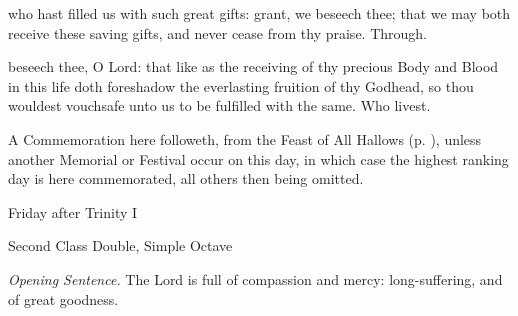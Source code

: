 
\clearpage
\postcommunion
{} who hast filled us with such great gifts: grant, we beseech thee; that we may both receive these saving gifts, and never cease from thy praise. Through.

 beseech thee, O Lord: that like as the receiving of thy precious Body and Blood in this life doth foreshadow the everlasting fruition of thy Godhead, so thou wouldest vouchsafe unto us to be fulfilled with the same. Who livest.

\begin{rubric}
	A Commemoration  here followeth, from the Feast of All Hallows (p. \pageref{AllHallowsCollect}), unless another Memorial or Festival occur on this day, in which case the highest ranking day is here commemorated, all others then being omitted.
\end{rubric}


\begin{inhead}
	{Friday after Trinity I}\par
    {Second Class Double, Simple Octave}
\end{inhead}
\par\noindent
\textit{Opening Sentence.} The Lord is full of compassion and mercy: long-suffering, and of great goodness.

